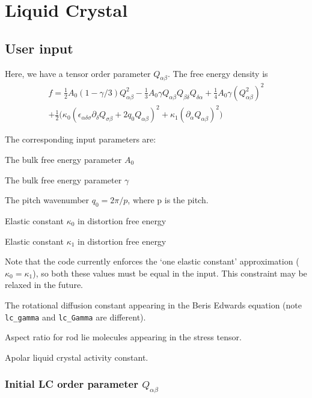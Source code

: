 \section{Liquid Crystal}

\subsection{User input}


Here, we have a tensor order parameter $Q_{\alpha\beta}$.
The free energy density is
\begin{eqnarray}
f = {\textstyle\frac{1}{2}}A_0(1 - \gamma/3)Q^2_{\alpha\beta}
  - {\textstyle\frac{1}{3}}A_0 \gamma
Q_{\alpha\beta}Q_{\beta\delta}Q_{\delta\alpha}
 + {\textstyle\frac{1}{4}}A_0 \gamma (Q^2_{\alpha\beta})^2
\nonumber
\\
+ {\textstyle\frac{1}{2}} \Big(
\kappa_0 (\epsilon_{\alpha\delta\sigma} \partial_\delta Q_{\sigma\beta} +
2q_0 Q_{\alpha\beta})^2 + \kappa_1(\partial_\alpha Q_{\alpha\beta})^2 \Big)
\end{eqnarray}

The corresponding input parameters are:

 The bulk free energy parameter $A_0$

 The bulk free energy parameter $\gamma$

 The pitch wavenumber $q_0 = 2\pi / p$, where p
is the pitch.

 Elastic constant $\kappa_0$ in distortion free energy

 Elastic constant $\kappa_1$ in distortion free energy

Note that the code currently enforces the `one elastic constant'
approximation ($\kappa_0 = \kappa_1$), so both these values must
be equal in the input. This constraint may be relaxed in the future.


 The rotational diffusion constant appearing in
the Beris Edwards equation (note \texttt{lc\_gamma} and \texttt{lc\_Gamma}
are different).

 Aspect ratio for rod lie molecules appearing in the
stress tensor.

 Apolar liquid crystal activity constant.

\subsubsection{Initial LC order parameter $Q_{\alpha\beta}$}

